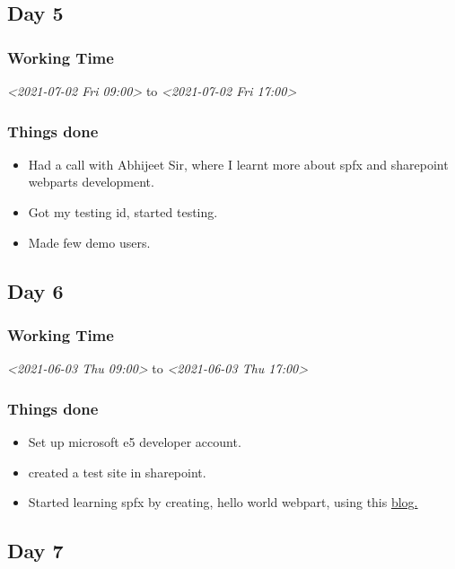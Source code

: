 \documentclass[11pt]{article}
\begin{document}
\subsection*{Day 5}
\label{sec:org9c01169}
\subsubsection*{Working Time}
\label{sec:org173b03a}
\textit{<2021-07-02 Fri 09:00> } to \textit{<2021-07-02 Fri 17:00>}

\subsubsection*{Things done}
\label{sec:orgf299b9f}
\begin{itemize}
\item Had a call with Abhijeet Sir, where I learnt more about spfx and sharepoint webparts development.
\item Got my testing id, started testing.
\item Made few demo users.
\end{itemize}
\subsection*{Day 6}
\label{sec:org6a02fba}
\subsubsection*{Working Time}
\label{sec:orgb24f865}
\textit{<2021-06-03 Thu 09:00> } to \textit{<2021-06-03 Thu 17:00>}

\subsubsection*{Things done}
\label{sec:org4ba341c}
\begin{itemize}
\item Set up microsoft e5 developer account.
\item created a test site in sharepoint.
\item Started learning spfx by creating, hello world webpart, using this \href{https://docs.microsoft.com/en-us/sharepoint/dev/spfx/web-parts/get-started/build-a-hello-world-web-part}{blog.}
\end{itemize}

\subsection*{Day 7}
\label{sec:org6966463}
\end{document}
